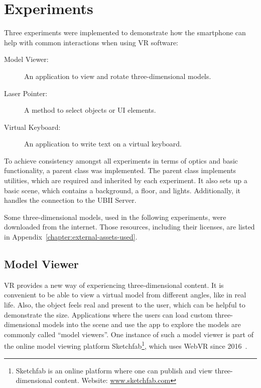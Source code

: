 \chapter{Experiments}\label{chapter:experiments}

Three experiments were implemented to demonstrate how the smartphone can help with common interactions when using \gls{VR} software:

\begin{description}
  \item[Model Viewer:] An application to view and rotate three-dimensional models.
  \item[Laser Pointer:] A method to select objects or \gls{UI} elements.
  \item[Virtual Keyboard:] An application to write text on a virtual keyboard.
\end{description}

To achieve consistency amongst all experiments in terms of optics and basic functionality, a parent class was implemented. The parent class implements utilities, which are required and inherited by each experiment. It also sets up a basic scene, which contains a background, a floor, and lights. Additionally, it handles the connection to the \gls{UBII} Server.

Some three-dimensional models, used in the following experiments, were downloaded from the internet. Those resources, including their licenses, are listed in Appendix~\ref{chapter:external-assets-used}.


\section{Model Viewer}\label{section:model-viewer}
\gls{VR} provides a new way of experiencing three-dimensional content. It is convenient to be able to view a virtual model from different angles, like in real life. Also, the object feels real and present to the user, which can be helpful to demonstrate the size. Applications where the users can load custom three-dimensional models into the scene and use the app to explore the models are commonly called \enquote{model viewers}. One instance of such a model viewer is part of the online model viewing platform Sketchfab\footnote{Sketchfab is an online platform where one can publish and view three-dimensional content. Website: \href{https://sketchfab.com}{www.sketchfab.com}}, which uses Web\gls{VR} since 2016~\cite{Denoyel.2016}. 


